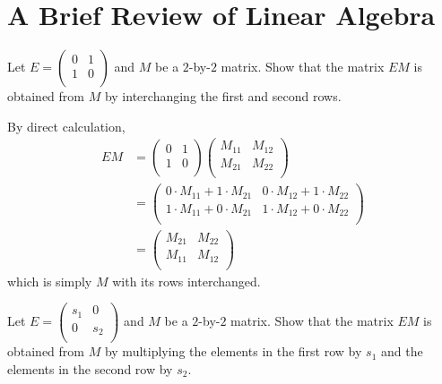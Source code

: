\documentclass[../group-theory-in-a-nutshell-for-physicists.tex]{subfiles}
\begin{document}
\printanswers

\section{A Brief Review of Linear Algebra}

\begin{questions}

\question Let $E = \begin{pmatrix}
0 & 1 \\
1 & 0 \\
\end{pmatrix}$ and $M$ be a $2$-by-$2$ matrix. Show that the matrix
$EM$ is obtained from $M$ by interchanging the first and second
rows.

\begin{solution}
	By direct calculation,
	\begin{align*}
		EM &= \begin{pmatrix}
		0 & 1 \\
		1 & 0 \\
		\end{pmatrix}\begin{pmatrix}
		M_{11} & M_{12} \\
		M_{21} & M_{22} \\
		\end{pmatrix} \\
		& = \begin{pmatrix}
		0 \cdot M_{11} + 1 \cdot M_{21} & 0 \cdot M_{12} + 1 \cdot M_{22} \\
		1 \cdot M_{11} + 0 \cdot M_{21} & 1 \cdot M_{12} + 0 \cdot M_{22} \\
		\end{pmatrix} \\
		& = \begin{pmatrix}
		M_{21} & M_{22} \\
		M_{11} & M_{12} \\
		\end{pmatrix}
	\end{align*}
	which is simply $M$ with its rows interchanged.
\end{solution}

\question Let $E = \begin{pmatrix}
s_{1} & 0 \\
0 & s_{2} \\
\end{pmatrix}$ and $M$ be a $2$-by-$2$ matrix. Show that the matrix
$EM$ is obtained from $M$ by multiplying the elements in the first
row by $s_{1}$ and the elements in the second row by $s_{2}$.


\end{questions}
\end{document}
